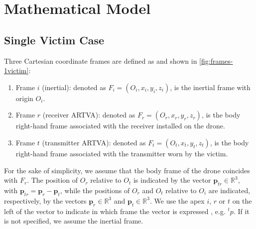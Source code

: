 \chapter{Mathematical Model}

\section{Single Victim Case}
Three Cartesian coordinate frames are defined as \cite{main} and shown in \ref{fig:frames-1victim}:
\begin{enumerate}[label=(\roman*)]
    \item Frame $i$ (inertial): denoted as $F_i = (O_i, x_i, y_i, z_i)$, is the inertial frame with origin $O_i$.
    \item Frame $r$ (receiver ARTVA): denoted as $F_r = (O_r, x_r, y_r, z_r)$, is the body right-hand frame associated with the receiver installed on the drone.
    \item Frame $t$ (transmitter ARTVA): denoted as $F_t = (O_t, x_t, y_t, z_t)$, is the body right-hand frame associated with the transmitter worn by the victim.
\end{enumerate}
For the sake of simplicity, we assume that the body frame of the drone coincides with $F_r$. 
The position of $O_r$ relative to $O_t$ is indicated by the vector $\mathbf{p}_{tr} \in \mathbb{R}^3$, with $\mathbf{p}_{tr} = \mathbf{p}_r - \mathbf{p}_t$, 
while the positions of $O_r$ and $O_t$ relative to $O_i$ are indicated, respectively, by the vectors $\mathbf{p}_r \in \mathbb{R}^3$ and $\mathbf{p}_t \in \mathbb{R}^3$.
We use the apex $i$, $r$ or $t$ on the left of the vector to indicate in which frame the vector is expressed , e.g. ${}^t p$. 
If it is not specified, we assume the inertial frame.
